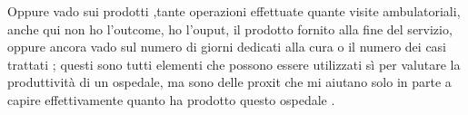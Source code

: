 Oppure vado sui prodotti ,tante operazioni effettuate quante visite
ambulatoriali, anche qui non ho l'outcome, ho l'ouput, il prodotto
fornito alla fine del servizio, oppure ancora vado sul numero di giorni
dedicati alla cura o il numero dei casi trattati ; questi sono tutti
elementi che possono essere utilizzati sì per valutare la produttività
di un ospedale, ma sono delle proxit che mi aiutano solo in parte a
capire effettivamente quanto ha prodotto questo ospedale .
